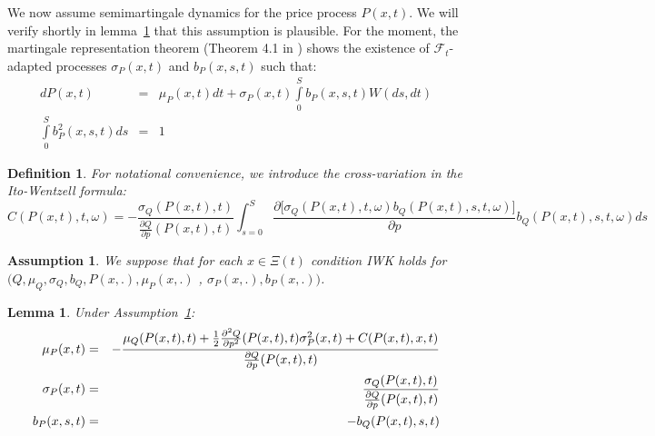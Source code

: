 \documentclass{article}
\newtheorem{lemma}[theorem]{Lemma}
\newtheorem{definition}{Definition}
\newtheorem{assumption}{Assumption}
\begin{document}
\bigskip

We now assume semimartingale dynamics for the price process $P(x,t)$. We
will verify shortly in lemma~\ref{lemma::para} that this assumption is
plausible. For the moment, the martingale representation theorem (Theorem
4.1 in \cite{CT06}) shows the existence of $\mathcal{F}_{t}$-adapted
processes $\sigma _{P}(x,t)$ and $b_{P}(x,s,t)$ such that:%
\begin{eqnarray}
dP(x,t) &=&\mu _{P}(x,t)dt+\sigma
_{P}(x,t)\int\limits_{0}^{S}b_{P}(x,s,t)W(ds,dt)  \label{equforP} \\
\int\limits_{0}^{S}b_{P}^{2}(x,s,t)ds &=&1
\end{eqnarray}


\begin{definition}
For notational convenience, we introduce the cross-variation in the
Ito-Wentzell formula:%
\begin{equation*}
C(P(x,t),t,\omega )=-\frac{\sigma _{Q}(P(x,t),t)}{\frac{\partial Q}{\partial
p}(P(x,t),t)}\int_{s=0}^{S}\frac{\partial \lbrack \sigma
_{Q}(P(x,t),t,\omega )b_{Q}(P(x,t),s,t,\omega )]}{\partial p}%
b_{Q}(P(x,t),s,t,\omega )ds
\end{equation*}
\end{definition}


\begin{assumption}
\label{ass::iwk_condition_Q} We suppose that for each $x\in \Xi (t)$
condition IWK holds for $(Q,\mu _{Q},\sigma _{Q},b_{Q},P(x,.),\mu _{P}(x,.)$%
, $\sigma _{P}(x,.),b_{P}(x,.))$.
\end{assumption}



\begin{lemma}
\label{lemma::para} Under Assumption~\ref{ass::iwk_condition_Q}:
\begin{eqnarray}
\mu _{P}(x,t) &=&-\frac{\mu _{Q}(P(x,t),t)+\frac{1}{2}\frac{\partial ^{2}Q}{%
\partial p^{2}}(P(x,t),t)\sigma _{P}^{2}(x,t)+C(P(x,t),x,t)}{\frac{\partial Q%
}{\partial p}(P(x,t),t)}  \label{mu_Px} \\
\sigma _{P}(x,t) &=&\frac{\sigma _{Q}(P(x,t),t)}{\frac{\partial Q}{\partial p%
}(P(x,t),t)}  \label{sigma_P} \\
b_{P}(x,s,t) &=&-b_{Q}(P(x,t),s,t)  \label{b_P}
\end{eqnarray}
\end{lemma}
\end{document}
